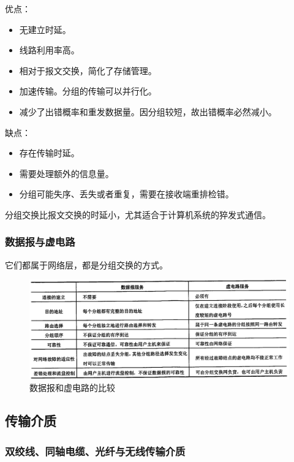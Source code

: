 \documentclass[12pt, a4paper, oneside]{ctexart}
\begin{document}
\begin{enumerate}
    优点：
    \begin{itemize}
        \item 无建立时延。
        \item 线路利用率高。
        \item 相对于报文交换，简化了存储管理。
        \item 加速传输。分组的传输可以并行化。
        \item 减少了出错概率和重发数据量。因分组较短，故出错概率必然减小。
    \end{itemize}
    缺点：
    \begin{itemize}
        \item 存在传输时延。
        \item 需要处理额外的信息量。
        \item 分组可能失序、丢失或者重复，需要在接收端重排检错。
    \end{itemize}
    分组交换比报文交换的时延小，尤其适合于计算机系统的猝发式通信。
\end{enumerate}

\subsubsection{数据报与虚电路}

它们都属于网络层，都是分组交换的方式。

\begin{figure}
    \centering
    \includegraphics[width=\textwidth]{./images/datagram_and_virtual_circuit.png}
    \caption{数据报和虚电路的比较}
\end{figure}

\subsection{传输介质}

\subsubsection{双绞线、同轴电缆、光纤与无线传输介质}
\end{document}
